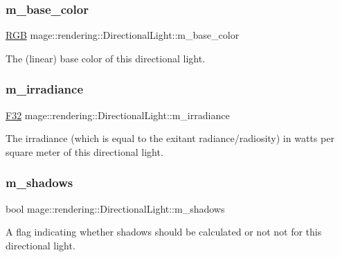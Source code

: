 \subsubsection{\texorpdfstring{m\+\_\+base\+\_\+color}{m\_base\_color}}
{\footnotesize\ttfamily \hyperlink{structmage_1_1_r_g_b}{R\+GB} mage\+::rendering\+::\+Directional\+Light\+::m\+\_\+base\+\_\+color\hspace{0.3cm}{\ttfamily [private]}}

The (linear) base color of this directional light. \hypertarget{classmage_1_1rendering_1_1_directional_light_a72b58bf80a9f40934622aee9f68aa545}{}\label{classmage_1_1rendering_1_1_directional_light_a72b58bf80a9f40934622aee9f68aa545} 
\subsubsection{\texorpdfstring{m\+\_\+irradiance}{m\_irradiance}}
{\footnotesize\ttfamily \hyperlink{namespacemage_aa97e833b45f06d60a0a9c4fc22ae02c0}{F32} mage\+::rendering\+::\+Directional\+Light\+::m\+\_\+irradiance\hspace{0.3cm}{\ttfamily [private]}}

The irradiance (which is equal to the exitant radiance/radiosity) in watts per square meter of this directional light. \hypertarget{classmage_1_1rendering_1_1_directional_light_a64fa40ef9f9d0ae8a0856aabd44f0cae}{}\label{classmage_1_1rendering_1_1_directional_light_a64fa40ef9f9d0ae8a0856aabd44f0cae} 
\subsubsection{\texorpdfstring{m\+\_\+shadows}{m\_shadows}}
{\footnotesize\ttfamily bool mage\+::rendering\+::\+Directional\+Light\+::m\+\_\+shadows\hspace{0.3cm}{\ttfamily [private]}}

A flag indicating whether shadows should be calculated or not not for this directional light. 